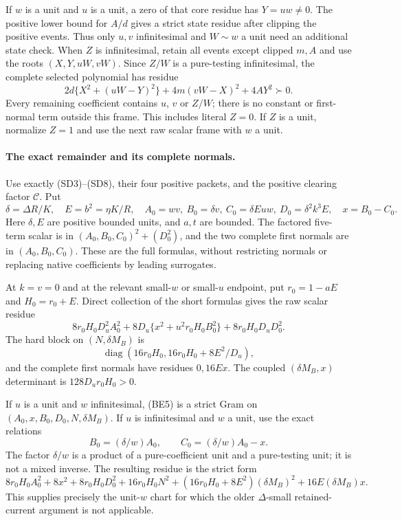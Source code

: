 If $w$ is a unit and $u$ is a unit, a zero of that core residue has
$Y=uw\ne0$. The positive lower bound for $A/d$ gives a strict state
residue after clipping the positive events. Thus only $u,v$
infinitesimal and $W\sim w$ a unit need an additional state check.
When $Z$ is infinitesimal, retain all events except clipped $m,A$ and
use the roots $(X,Y,uW,vW)$. Since $Z/W$ is a pure-testing
infinitesimal, the complete selected polynomial has residue
\[
 2d\{X^2+(uW-Y)^2\}+4m(vW-X)^2+4AY^2\succ0.
 \tag{BE4}
\]
Every remaining coefficient contains $u$, $v$ or $Z/W$; there is no
constant or first-normal term outside this frame. This includes
literal $Z=0$. If $Z$ is a unit, normalize $Z=1$ and use the next
raw scalar frame with $w$ a unit.

\paragraph{The exact remainder and its complete normals.}
Use exactly (SD3)--(SD8), their four positive packets, and the positive
clearing factor $\mathcal C$. Put
\[
 \delta=\Delta R/K,\quad E=b^2=\eta K/R,\quad
 A_0=wv,\ B_0=\delta v,\ C_0=\delta Euw,
 \ D_0=\delta^2k^3E,\quad x=B_0-C_0.
\]
Here $\delta,E$ are positive bounded units, and $a,t$ are bounded.
The factored five-term scalar is in
$(A_0,B_0,C_0)^2+(D_0^2)$, and the two complete first normals are
in $(A_0,B_0,C_0)$. These are the full formulas, without restricting
normals or replacing native coefficients by leading surrogates.

At $k=v=0$ and at the relevant small-$w$ or small-$u$ endpoint, put
$r_0=1-aE$ and $H_0=r_0+E$. Direct collection of the short formulas
gives the raw scalar residue
\[
 8r_0H_0D_u^2 A_0^2+
 8D_u\{x^2+u^2r_0H_0B_0^2\}+8r_0H_0D_uD_0^2.
 \tag{BE5}
\]
The hard block on $(N,\delta M_B)$ is
\[
 \operatorname{diag}(16r_0H_0,16r_0H_0+8E^2/D_u),
\]
and the complete first normals have residues $0,16Ex$.
The coupled $(\delta M_B,x)$ determinant is
$128D_ur_0H_0>0$.

If $u$ is a unit and $w$ infinitesimal, (BE5) is a strict Gram on
$(A_0,x,B_0,D_0,N,\delta M_B)$. If $u$ is infinitesimal and $w$ a
unit, use the exact relations
\[
 B_0=(\delta/w)A_0,\qquad C_0=(\delta/w)A_0-x.
\]
The factor $\delta/w$ is a product of a pure-coefficient unit and a
pure-testing unit; it is not a mixed inverse. The resulting residue
is the strict form
\[
 8r_0H_0A_0^2+8x^2+8r_0H_0D_0^2
 +16r_0H_0N^2+(16r_0H_0+8E^2)(\delta M_B)^2
 +16E(\delta M_B)x.                                  \tag{BE6}
\]
This supplies precisely the unit-$w$ chart for which the older
$\Delta$-small retained-current argument is not applicable.

